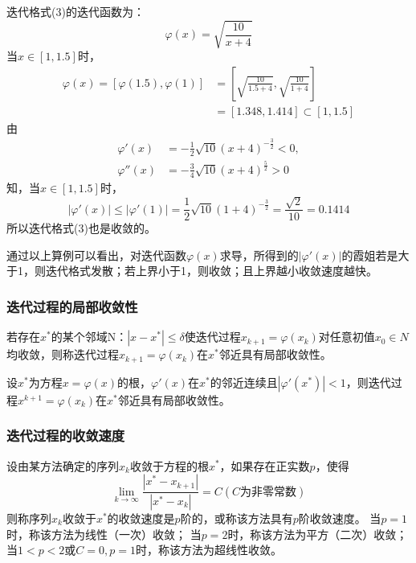 \begin{extend}
    迭代格式(3)的迭代函数为：
    \begin{equation*}
        \varphi(x) = \sqrt{\frac{10}{x+4}}
    \end{equation*}
    当$x \in [1,1.5]$时，
    \begin{align*}
        \varphi(x) = [\varphi(1.5),\varphi(1)] & = \left[\sqrt{\frac{10}{1.5+4}},\sqrt{\frac{10}{1+4}}\right]\\
        & = [1.348,1.414] \subset [1,1.5]
    \end{align*}
    由
        \begin{align*}
            \varphi'(x) &= -\frac{1}{2}\sqrt{10}(x+4)^{-\frac{3}{2}} < 0,\\
            \varphi''(x) &= -\frac{3}{4}\sqrt{10}(x+4)^{\frac{5}{2}} > 0
        \end{align*}
    知，当$x \in [1,1.5]$时，
    \begin{equation*}
        |\varphi'(x)| \leq |\varphi'(1)| = \frac{1}{2}\sqrt{10}(1+4)^{-\frac{3}{2}} = \frac{\sqrt{2}}{10} = 0.1414
    \end{equation*}
    所以迭代格式(3)也是收敛的。

    通过以上算例可以看出，对迭代函数$\varphi(x)$求导，所得到的$|\varphi'(x)|$的霞姐若是大于1，则迭代格式发散；若上界小于1，则收敛；且上界越小收敛速度越快。
\end{extend}

\subsubsection{迭代过程的局部收敛性}
\begin{definition}
    若存在$x^*$的某个邻域N：$|x-x^*| \leq \delta $使迭代过程$x_{k+1} = \varphi(x_k)$对任意初值$x_0 \in N$均收敛，则称迭代过程$x_{k+1} = \varphi(x_k)$在$x^*$邻近具有局部收敛性。
\end{definition}

\begin{theorem}
    设$x^*$为方程$x = \varphi(x)$的根，$\varphi'(x)$在$x^*$的邻近连续且$|\varphi'(x^*)| < 1$，则迭代过程$x^{k+1} = \varphi(x_k)$在$x^*$邻近具有局部收敛性。
\end{theorem}

\subsubsection{迭代过程的收敛速度}
\begin{definition}
    设由某方法确定的序列${x_k}$收敛于方程的根$x^*$，如果存在正实数$p$，使得
    \begin{equation*}
        \lim_{k \to \infty }\frac{|x^*-x_{k+1}|}{|x^*-x_k|} = C(C\text{为非零常数})
    \end{equation*}
    则称序列${x_k}$收敛于$x^*$的收敛速度是$p$阶的，或称该方法具有$p$阶收敛速度。
    当$p = 1$时，称该方法为线性（一次）收敛；
    当$p = 2$时，称该方法为平方（二次）收敛；
    当$1<p<2$或$C = 0,p = 1$时，称该方法为超线性收敛。
\end{definition}

